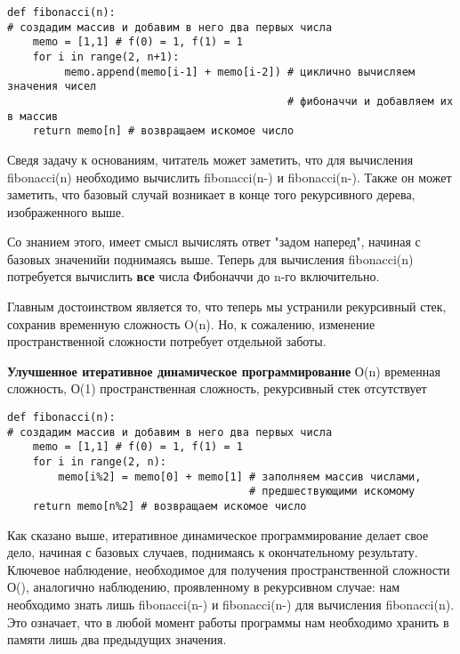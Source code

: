 \vspace{\baselineskip}
\begin{tcolorbox}
\begin{verbatim}
def fibonacci(n):
# создадим массив и добавим в него два первых числа
    memo = [1,1] # f(0) = 1, f(1) = 1
    for i in range(2, n+1):
         memo.append(memo[i-1] + memo[i-2]) # циклично вычисляем значения чисел 
                                            # фибоначчи и добавляем их в массив
    return memo[n] # возвращаем искомое число
\end{verbatim}
\end{tcolorbox}

\vspace{\baselineskip}
Сведя задачу к основаниям, читатель может заметить, что для вычисления fibonacci(n) необходимо вычислить fibonacci(n-) и fibonacci(n-). Также он может заметить, что базовый случай возникает в конце того рекурсивного дерева, изображенного выше. 

\vspace{\baselineskip}
Со знанием этого, имеет смысл вычислять ответ "задом наперед", начиная с базовых значенийи поднимаясь выше. Теперь для вычисления fibonacci(n) потребуется вычислить \textbf{все} числа Фибоначчи до n-го включительно.

\vspace{\baselineskip}
Главным достоинством является то, что теперь мы устранили рекурсивный стек, сохранив временную сложность O(n). Но, к сожалению, изменение пространственной сложности потребует отдельной заботы.

\vspace{\baselineskip}
\textbf{Улучшенное итеративное динамическое программирование} О(n) временная сложность, О(1) пространственная сложность, рекурсивный стек отсутствует

\vspace{\baselineskip}
\begin{tcolorbox}
\begin{verbatim}
def fibonacci(n):
# создадим массив и добавим в него два первых числа
    memo = [1,1] # f(0) = 1, f(1) = 1
    for i in range(2, n):
        memo[i%2] = memo[0] + memo[1] # заполняем массив числами, 
                                      # предшествующими искомому
    return memo[n%2] # возвращаем искомое число
\end{verbatim}
\end{tcolorbox}

\vspace{\baselineskip}
Как сказано выше, итеративное динамическое программирование делает свое дело, начиная с базовых случаев, поднимаясь к окончательному результату. Ключевое наблюдение, необходимое для получения пространственной сложности О(), аналогично наблюдению, проявленному в рекурсивном случае: нам необходимо знать лишь fibonacci(n-) и fibonacci(n-) для вычисления fibonacci(n). Это означает, что в любой момент работы программы нам необходимо хранить в памяти лишь два предыдущих значения.

